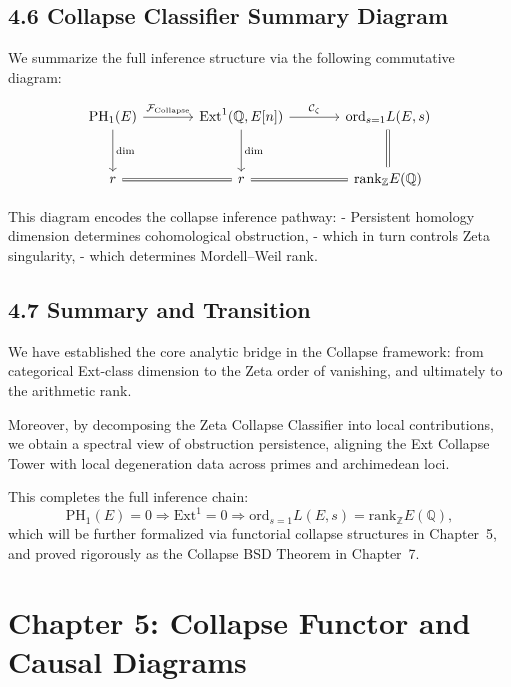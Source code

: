 \documentclass[11pt]{article}
\begin{document}
\subsection{4.6 Collapse Classifier Summary Diagram}

We summarize the full inference structure via the following commutative diagram:

\[
\begin{tikzcd}[row sep=large, column sep=large]
\mathrm{PH}_1(E) \arrow[r, "\mathcal{F}_{\mathrm{Collapse}}"] \arrow[d, "\dim"]
& \mathrm{Ext}^1(\mathbb{Q},E[n]) \arrow[d, "\dim"] \arrow[r, "\mathcal{C}_{\zeta}"]
& \mathrm{ord}_{s=1} L(E,s) \arrow[d, equal] \\
r \arrow[r, equal] & r \arrow[r, equal] & \mathrm{rank}_{\mathbb{Z}} E(\mathbb{Q})
\end{tikzcd}
\]

This diagram encodes the collapse inference pathway:
- Persistent homology dimension determines cohomological obstruction,
- which in turn controls Zeta singularity,
- which determines Mordell–Weil rank.

\subsection{4.7 Summary and Transition}

We have established the core analytic bridge in the Collapse framework:  
from categorical Ext-class dimension to the Zeta order of vanishing, and ultimately to the arithmetic rank.

Moreover, by decomposing the Zeta Collapse Classifier into local contributions, we obtain a spectral view of obstruction persistence, aligning the Ext Collapse Tower with local degeneration data across primes and archimedean loci.

This completes the full inference chain:
\[
\mathrm{PH}_1(E) = 0 \Rightarrow \mathrm{Ext}^1 = 0 \Rightarrow \mathrm{ord}_{s=1} L(E,s) = \mathrm{rank}_{\mathbb{Z}} E(\mathbb{Q}),
\]
which will be further formalized via functorial collapse structures in Chapter~5, and proved rigorously as the Collapse BSD Theorem in Chapter~7.




\section{Chapter 5: Collapse Functor and Causal Diagrams}
\end{document}

